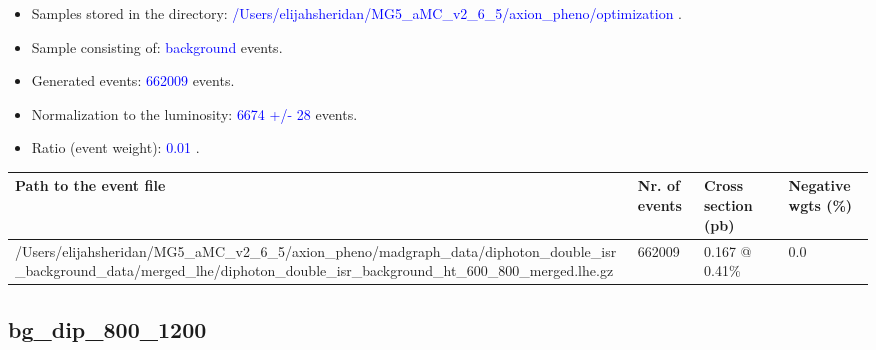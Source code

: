 \documentclass[a4paper, 10pt]{article}
\begin{document}
\begin{itemize}
  \item Samples stored in the directory: \textcolor{blue}{/\-Users/\-elijahsheridan/\-MG5\_aMC\_v2\_6\_5/\-axion\_pheno/\-optimization} .
   \item Sample consisting of: \textcolor{blue}{background}  events.
   \item Generated events: \textcolor{blue}{662009 }  events.
   \item Normalization to the luminosity: \textcolor{blue}{6674}\textcolor{blue}{ +/\-- }\textcolor{blue}{28 }  events.
   \item Ratio (event weight): \textcolor{blue}{0.01 } .  
 
\end{itemize}
\begin{table}[H]
  \begin{center}
    \begin{tabular}{|m{55.0mm}|m{25.0mm}|m{30.0mm}|m{30.0mm}|}
      \hline
      {\cellcolor{yellow}         Path to the event file}& {\cellcolor{yellow}         Nr. of events}& {\cellcolor{yellow}         Cross section (pb)}& {\cellcolor{yellow}         Negative wgts (\%)}\\
      \hline
      {\cellcolor{white}          /\-Users/\-elijahsheridan/\-MG5\_aMC\_v2\_6\_5/\-axion\_pheno/\-madgraph\_data/\-diphoton\_double\_isr\_background\_data/\-merged\_lhe/\-diphoton\_double\_isr\_background\_ht\_600\_800\_merged.lhe.gz}& {\cellcolor{white}          662009}& {\cellcolor{white}          0.167 @ 0.41\%}& {\cellcolor{white}          0.0}\\
\hline
    \end{tabular}
  \end{center}
\end{table}

\subsection{ bg\_dip\_800\_1200}
\end{document}
